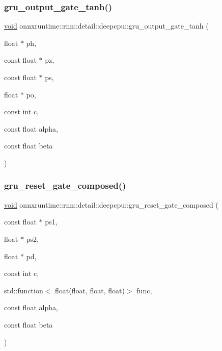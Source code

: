 \mbox{\label{namespaceonnxruntime_1_1rnn_1_1detail_1_1deepcpu_a8b6250d6233998108f91689c51fde355}} 
\subsubsection{\texorpdfstring{gru\+\_\+output\+\_\+gate\+\_\+tanh()}{gru\_output\_gate\_tanh()}}
{\footnotesize\ttfamily \mbox{\hyperlink{mlasi_8h_a88f941d423cb2a819b70a1358982b1a6}{void}} onnxruntime\+::rnn\+::detail\+::deepcpu\+::gru\+\_\+output\+\_\+gate\+\_\+tanh (\begin{DoxyParamCaption}\item[{float $\ast$}]{ph,  }\item[{const float $\ast$}]{pz,  }\item[{const float $\ast$}]{ps,  }\item[{float $\ast$}]{po,  }\item[{const int}]{c,  }\item[{const float}]{alpha,  }\item[{const float}]{beta }\end{DoxyParamCaption})}

\mbox{\label{namespaceonnxruntime_1_1rnn_1_1detail_1_1deepcpu_abfd832861f6bbba6a17be29e3150438b}} 
\subsubsection{\texorpdfstring{gru\+\_\+reset\+\_\+gate\+\_\+composed()}{gru\_reset\_gate\_composed()}}
{\footnotesize\ttfamily \mbox{\hyperlink{mlasi_8h_a88f941d423cb2a819b70a1358982b1a6}{void}} onnxruntime\+::rnn\+::detail\+::deepcpu\+::gru\+\_\+reset\+\_\+gate\+\_\+composed (\begin{DoxyParamCaption}\item[{const float $\ast$}]{ps1,  }\item[{float $\ast$}]{ps2,  }\item[{float $\ast$}]{pd,  }\item[{const int}]{c,  }\item[{std\+::function$<$ float(float, float, float)$>$}]{func,  }\item[{const float}]{alpha,  }\item[{const float}]{beta }\end{DoxyParamCaption})}

